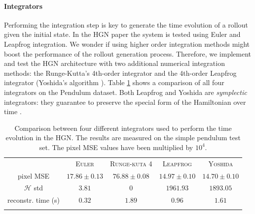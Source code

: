 \paragraph{Integrators} \label{sec:integrators}
Performing the integration step is key to generate the time evolution of a rollout given the initial state. 
In the HGN paper \cite{hgn} the system is tested using Euler and Leapfrog integration. We wonder if using higher order integration methods might boost the performance of the rollout generation process.
Therefore, we implement and test the HGN architecture with two additional numerical integration methods: the Runge-Kutta's 4th-order integrator \cite{rk4} and the 4th-order Leapfrog integrator (Yoshida's algorithm \cite{yoshida1992symplectic}). Table \ref{tab:integrators} shows a comparison of all four integrators on the Pendulum dataset.
Both Leapfrog and Yoshida are \textit{symplectic} integrators: they guarantee to preserve the special form of the Hamiltonian over time \cite{neal2011mcmc}.

\begin{table}[]
    \centering

    \begin{tabular}{c c c c c}
     \Xhline{3\arrayrulewidth}
      & \textsc{Euler} & \textsc{Runge-kuta 4} & \textsc{Leapfrog} & \textsc{Yoshida}\\

     \Xhline{3\arrayrulewidth}
     pixel MSE & $17.86 \pm 0.13$ & $76.88 \pm 0.08$ & $14.97\pm 0.10$ & $14.70\pm 0.10$ \\
     $\mathcal{H}$ std & $3.81$ & $0$ & $1961.93$ & $1893.05$\\
     reconstr. time (s) & $0.32$ & $1.89$ & $0.96$ & $1.61$ \\

     \Xhline{3\arrayrulewidth}
    
    \end{tabular}
    \vspace{0.25cm}
    \caption{Comparison between four different integrators used to perform the time evolution in the HGN. The results are measured on the simple pendulum test set. The pixel MSE values have been multiplied by $10^4$.}
    \label{tab:integrators}
\end{table}

